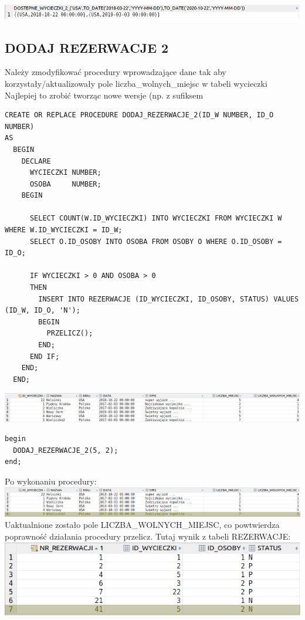 \includegraphics[width=\linewidth]{./images/dostepne_wycieczki_2_.png}

\subsection{DODAJ REZERWACJE 2}
Należy zmodyfikować procedury wprowadzające dane tak aby korzystały/aktualizowały pole
liczba\_wolnych\_miejsc w tabeli wycieczki
Najlepiej to zrobić tworząc nowe wersje (np. z sufiksem 

\begin{verbatim}
CREATE OR REPLACE PROCEDURE DODAJ_REZERWACJE_2(ID_W NUMBER, ID_O NUMBER)
AS
  BEGIN
    DECLARE
      WYCIECZKI NUMBER;
      OSOBA     NUMBER;
    BEGIN

      SELECT COUNT(W.ID_WYCIECZKI) INTO WYCIECZKI FROM WYCIECZKI W WHERE W.ID_WYCIECZKI = ID_W;
      SELECT O.ID_OSOBY INTO OSOBA FROM OSOBY O WHERE O.ID_OSOBY = ID_O;

      IF WYCIECZKI > 0 AND OSOBA > 0
      THEN
        INSERT INTO REZERWACJE (ID_WYCIECZKI, ID_OSOBY, STATUS) VALUES (ID_W, ID_O, 'N');
        BEGIN
          PRZELICZ();
        END;
      END IF;
    END;
  END;
\end{verbatim}

\includegraphics[width=\linewidth]{./images/dodaj_rezerwacje_2.png}

\begin{verbatim}
begin
  DODAJ_REZERWACJE_2(5, 2);
end;
\end{verbatim}
Po wykonaniu procedury:\\
\includegraphics[width=\linewidth]{./images/dodaj_rezerwacje_2_.png}
Uaktualnione zostało pole LICZBA\_WOLNYCH\_MIEJSC, co powtwierdza poprawność działania procedury przelicz.
Tutaj wynik z tabeli REZERWACJE:\\ 
\includegraphics[width=\linewidth]{./images/dodaj_rezerwacje_2__.png}

